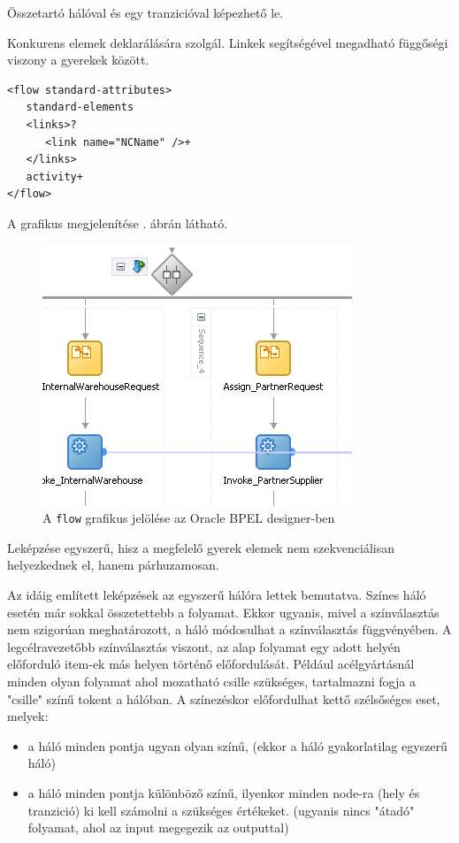Összetartó hálóval és egy tranzicióval képezhető le.



Konkurens elemek deklarálására szolgál. Linkek segítségével megadható függőségi viszony a gyerekek között. 
\begin{verbatim}
<flow standard-attributes>
   standard-elements
   <links>?
      <link name="NCName" />+
   </links>
   activity+
</flow>
\end{verbatim} 
A grafikus megjelenítése . ábrán látható.

\begin{figure}[h!]
\centering
\includegraphics[scale=1]{images/flow.png}
\caption{A \texttt{flow} grafikus jelölése az Oracle BPEL designer-ben}
\label{fig:flow}
\end{figure}
Leképzése egyszerű, hisz a megfelelő gyerek elemek nem szekvenciálisan helyezkednek el, hanem párhuzamosan.

Az idáig említett leképzések az egyszerű hálóra lettek bemutatva. Színes háló esetén már sokkal összetettebb a folyamat. Ekkor ugyanis, mivel a színválasztás nem szigorúan meghatározott, a háló módosulhat a színválasztás függvényében. A legcélravezetőbb színválasztás viszont, az alap folyamat egy adott helyén előforduló item-ek más helyen történő előfordulását. Például acélgyártásnál minden olyan folyamat ahol mozatható csille szükséges, tartalmazni fogja a "csille" színű tokent a hálóban. A színezéskor előfordulhat kettő szélsőséges eset, melyek:
\begin{itemize}
\item a háló minden pontja ugyan olyan színű, (ekkor a háló gyakorlatilag egyszerű háló)
\item a háló minden pontja különböző színű, ilyenkor minden node-ra (hely és tranzició) ki kell számolni a szükséges értékeket. (ugyanis nincs "átadó" folyamat, ahol az input megegezik az outputtal)
\end{itemize}



